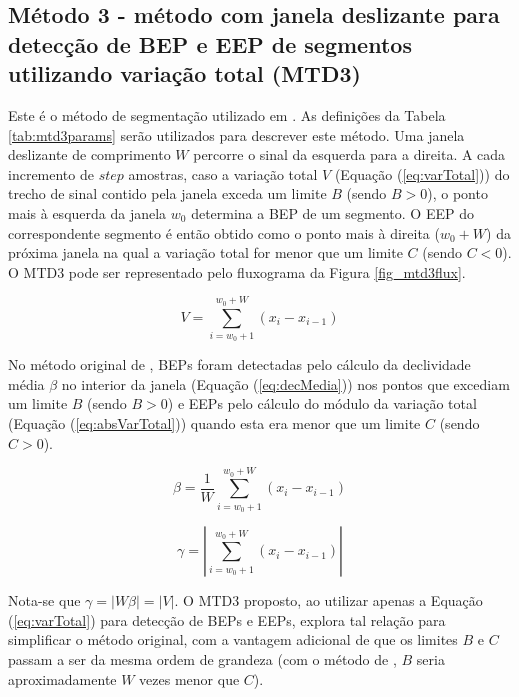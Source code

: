 			\subsection{Método 3 - método com janela deslizante para detecção de BEP e EEP de segmentos utilizando variação total (MTD3)}
Este é o método de segmentação utilizado em . As definições da Tabela \ref{tab:mtd3params} serão utilizados para descrever este método. Uma janela deslizante de comprimento $W$ percorre o sinal da esquerda para a direita. A cada incremento de $step$ amostras, caso a variação total $V$ (Equação (\ref{eq:varTotal})) do trecho de sinal contido pela janela exceda um limite $B$ (sendo $B > 0$), o ponto mais à esquerda da janela $w_0$ determina a BEP de um segmento. O EEP do correspondente segmento é então obtido como o ponto mais à direita ($w_0 + W$) da próxima janela na qual a variação total for menor que um limite $C$ (sendo $C < 0$). O MTD3 pode ser representado pelo fluxograma da Figura \ref{fig_mtd3flux}.



\begin{equation}
\label{eq:varTotal}
	V = \sum\limits_{i=w_0+1}^{w_0+W} (x_i - x_{i-1})
\end{equation}



No método original de , BEPs foram detectadas pelo cálculo da declividade média $\beta$ no interior da janela (Equação (\ref{eq:decMedia})) nos pontos que excediam um limite $B$ (sendo $B > 0$) e EEPs pelo cálculo do módulo da variação total (Equação (\ref{eq:absVarTotal})) quando esta era menor que um limite $C$ (sendo $C > 0$).

\begin{equation}
\label{eq:decMedia}
	\beta = \frac{1}{W}\sum\limits_{i=w_0+1}^{w_0+W} (x_i - x_{i-1})
\end{equation}

\begin{equation}
\label{eq:absVarTotal}
	\gamma = \left|\sum\limits_{i=w_0+1}^{w_0+W} (x_i - x_{i-1})\right|
\end{equation}

Nota-se que $\gamma = |W\beta| = |V|$. O MTD3 proposto, ao utilizar apenas a Equação (\ref{eq:varTotal}) para detecção de BEPs e EEPs, explora tal relação para simplificar o método original, com a vantagem adicional de que os limites $B$ e $C$ passam a ser da mesma ordem de grandeza (com o método de , $B$ seria aproximadamente $W$ vezes menor que $C$).


